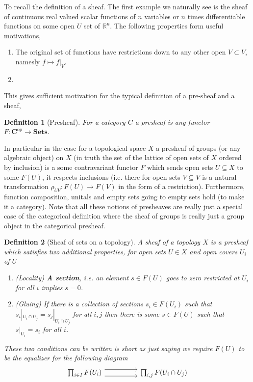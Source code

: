 \documentclass[12pt]{article}
\numberwithin{equation}{section}
\newcommand{\R}{\mathbb{R}}
\newtheorem{definition}{Definition}[section]
\begin{document}
\begin{appendices}
\begin{enumerate}
			To recall the definition of a sheaf. The first example we naturally see is the sheaf of continuous real valued scalar functions of $n$ variables or $n$ times differentiable functions on some open $ U$ set of $\R^n$. The following properties form useful motivations,
			\begin{enumerate}
				\item The original set of functions have restrictions down to any other open $V \subset V$, namesly $f \mapsto f|_V$.
				\item 
			\end{enumerate}
			This gives sufficient motivation for the typical definition of a pre-sheaf and a sheaf,
			\begin{definition}[Presheaf]
				For a category $C$ a presheaf is any functor $F: \mathbf{C}^{\mathrm{op}}\to \mathbf{Sets}$.
			\end{definition}
			In particular in the case for a topological space $X$ a presheaf of groups (or any algebraic object) on $X$ (in truth the set of the lattice of open sets of $X$ ordered by inclusion) is a some contravariant functor $F$ which sends open sets $U \subseteq X$ to some $F(U)$, it respects inclusions (i.e. there for open sets $V \subseteq V $ is a natural transformation $\rho_{UV}: F(U)\to F(V)$ in the form of a restriction). Furthermore, function composition, unitals and empty sets going to empty sets hold (to make it a category). Note that all these notions of presheaves are really just a special case of the categorical definition where the sheaf of groups is really just a group object in the categorical presheaf.
			\begin{definition}[Sheaf of sets on a topology]
				A sheaf of a topology $X$ is a presheaf which satisfies two additional properties, for open sets $U \in X$ and open covers ${U_i}$ of $U$
				\begin{enumerate}
					\item (Locality)  \textbf{A section}, i.e. an element $s \in F(U)$ goes to zero restricted at $U_i$ for all $i$ implies $s=0$.
					\item (Gluing) If there is a collection of sections $s_i \in F(U_i)$ such that $s_i|_{U_i \cap U_j}=s_j|_{U_i \cap U_j}$ for all $i,j$ then there is some $s \in F(U)$ such that $s|_{U_i}=s_i$ for all $i$.
				\end{enumerate}
				
				These two conditions can be written is short as just saying we require $F(U)$ to be the equalizer for the following diagram
				\[\begin{tikzcd}
					{\prod_{i \in I} F(U_i)} && {\prod_{i,j}F(U_i \cap U_j)}
					\arrow[shift right=2, from=1-1, to=1-3]
					\arrow[shift left=2, from=1-1, to=1-3]
				\end{tikzcd}\]
			\end{definition}
			

\end{enumerate}
\end{appendices}
\end{document}
